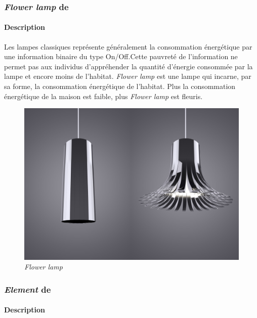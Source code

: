 \documentclass[10pt,a5paper,twoside]{article}
\begin{document}
\subsubsection{\emph{Flower lamp} de
\citet{lagerkvist2016flower}}\label{flower-lamp-de-lagerkvist2016flower}

\paragraph{Description}\label{description-7}

Les lampes classiques représente généralement la consommation
énergétique par une information binaire du type On/Off.Cette pauvreté de
l'information ne permet pas aux individus d'appréhender la quantité
d'énergie consommée par la lampe et encore moins de l'habitat.
\emph{Flower lamp} est une lampe qui incarne, par sa forme, la
consommation énergétique de l'habitat. Plus la consommation énergétique
de la maison est faible, plus \emph{Flower lamp} est fleuris.

\begin{figure}
\centering
\includegraphics[]{images/flowerlamp-screenshot1.jpg}
\caption{\emph{Flower lamp}}\label{fig:flowerlamp1}
\end{figure}

\subsubsection{\emph{Element} de
\citet{gyllensward2006visualizing}}\label{element-de-gyllensward2006visualizing}

\paragraph{Description}\label{description-8}
\end{document}
